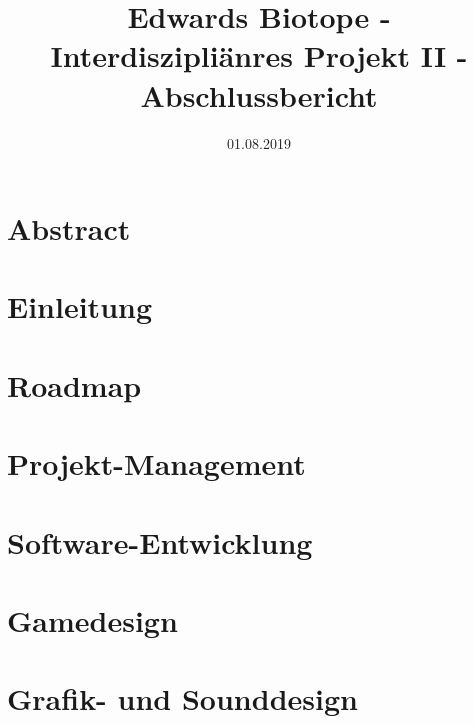 \documentclass[12pt ,letterpaper]{article}
\title{Edwards Biotope - Interdiszipliänres Projekt II - Abschlussbericht}
\date{01.08.2019}
\begin{document}
\begin{onehalfspace}
\maketitle
\tableofcontents
\pagebreak
\section{Abstract}
\section{Einleitung}
\pagebreak
\section{Roadmap}

\pagebreak
\section{Projekt-Management}
\section{Software-Entwicklung}



\section{Gamedesign}

\section{Grafik- und Sounddesign} 

\pagebreak

\pagebreak


\listoffigures
\end{onehalfspace}
\end{document}
